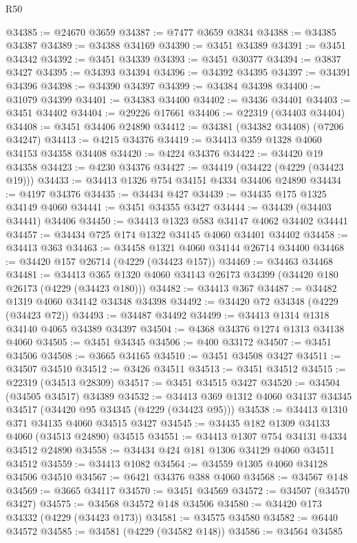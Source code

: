 \begin{lexlean}{R50}
\begin{coremodule}
@34385 := @24670 @3659
@34387 := @7477 @3659 @3834
@34388 := @34385 @34387
@34389 := @34388 @34169
@34390 := @3451 @34389
@34391 := @3451 @34342
@34392 := @3451 @34339
@34393 := @3451 @30377
@34394 := @3837 @3427
@34395 := @34393 @34394
@34396 := @34392 @34395
@34397 := @34391 @34396
@34398 := @34390 @34397
@34399 := @34384 @34398
@34400 := @31079 @34399
@34401 := @34383 @34400
@34402 := @3436 @34401
@34403 := @3451 @34402
@34404 := @29226 @17661
@34406 := @22319 (@34403 @34404)
@34408 := @3451 @34406 @24890
@34412 := @34381 (@34382 @34408) (@7206 @34247)
@34413 := @4215 @34376
@34419 := @34413 @359 @1328 @4060 @34153 @34358 @34408
@34420 := @4224 @34376
@34422 := @34420 @19 @34358
@34423 := @4230 @34376
@34427 := @34419 (@34422 (@4229 (@34423 @19)))
@34433 := @34413 @1326 @754 @34151 @4334 @34406 @24890
@34434 := @4197 @34376
@34435 := @34434 @427
@34439 := @34435 @175 @1325 @34149 @4060
@34441 := @3451 @34355 @3427
@34444 := @34439 (@34403 @34441) @34406
@34450 := @34413 @1323 @583 @34147 @4062 @34402 @34441
@34457 := @34434 @725 @174 @1322 @34145 @4060 @34401 @34402
@34458 := @34413 @363
@34463 := @34458 @1321 @4060 @34144 @26714 @34400
@34468 := @34420 @157 @26714 (@4229 (@34423 @157))
@34469 := @34463 @34468
@34481 := @34413 @365 @1320 @4060 @34143 @26173 @34399 (@34420 @180 @26173 (@4229 (@34423 @180)))
@34482 := @34413 @367
@34487 := @34482 @1319 @4060 @34142 @34348 @34398
@34492 := @34420 @72 @34348 (@4229 (@34423 @72))
@34493 := @34487 @34492
@34499 := @34413 @1314 @1318 @34140 @4065 @34389 @34397
@34504 := @4368 @34376 @1274 @1313 @34138 @4060
@34505 := @3451 @34345
@34506 := @400 @33172
@34507 := @3451 @34506
@34508 := @3665 @34165
@34510 := @3451 @34508 @3427
@34511 := @34507 @34510
@34512 := @3426 @34511
@34513 := @3451 @34512
@34515 := @22319 (@34513 @28309)
@34517 := @3451 @34515 @3427
@34520 := @34504 (@34505 @34517) @34389
@34532 := @34413 @369 @1312 @4060 @34137 @34345 @34517 (@34420 @95 @34345 (@4229 (@34423 @95)))
@34538 := @34413 @1310 @371 @34135 @4060 @34515 @3427
@34545 := @34435 @182 @1309 @34133 @4060 (@34513 @24890) @34515
@34551 := @34413 @1307 @754 @34131 @4334 @34512 @24890
@34558 := @34434 @424 @181 @1306 @34129 @4060 @34511 @34512
@34559 := @34413 @1082
@34564 := @34559 @1305 @4060 @34128 @34506 @34510
@34567 := @6421 @34376 @388 @4060
@34568 := @34567 @148
@34569 := @3665 @34117
@34570 := @3451 @34569
@34572 := @34507 (@34570 @3427)
@34575 := @34568 @34572 @148 @34506
@34580 := @34420 @173 @34332 (@4229 (@34423 @173))
@34581 := @34575 @34580
@34582 := @6440 @34572
@34585 := @34581 (@4229 (@34582 @148))
@34586 := @34564 @34585

\end{coremodule}
\end{lexlean}
